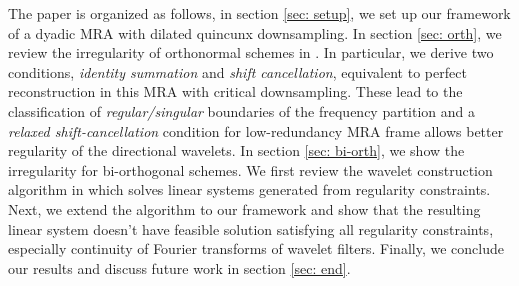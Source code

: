 The paper is organized as follows, in section \ref{sec: setup}, we set up our framework of a dyadic MRA with dilated quincunx downsampling. In section \ref{sec: orth}, we review the irregularity of orthonormal schemes in \cite{yin2014orthshear}. In particular, we derive two conditions, {\it identity summation} and {\it shift cancellation}, equivalent to perfect reconstruction in this MRA with critical downsampling. These lead to the classification of {\it regular/singular} boundaries of the frequency partition %
and a {\it relaxed shift-cancellation} condition for low-redundancy MRA frame allows better regularity of the directional wavelets. 
In section \ref{sec: bi-orth}, we show the irregularity for bi-orthogonal schemes. We first review the wavelet construction algorithm in \cite{cohen1993compactly} which solves linear systems generated from regularity constraints. Next, we extend the algorithm to our framework and show that the resulting linear system doesn't have feasible solution satisfying all regularity constraints, especially continuity of Fourier transforms of wavelet filters.  
Finally, we conclude our results and discuss future work in section \ref{sec: end}.
